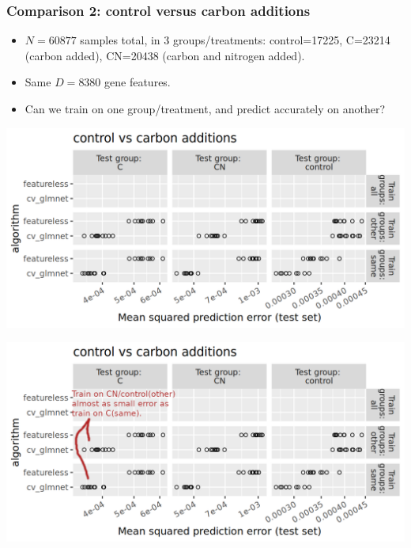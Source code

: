\documentclass{beamer}
\begin{document}

\begin{frame}
  \frametitle{Comparison 2: control versus carbon additions}
  \begin{itemize}
  \item $N=60877$ samples total, in 3 groups/treatments:
    control=17225, C=23214 (carbon added), CN=20438 (carbon and nitrogen added).
  \item Same $D=8380$ gene features.
  \item Can we train on one group/treatment, and predict accurately on another?
  \end{itemize}
\end{frame}

\begin{frame}
  \includegraphics[width=\textwidth]{qsip_pc2_all_new-control.vs.carbon.additions.other.png}
\end{frame}

\begin{frame}
  \includegraphics[width=\textwidth]{qsip_pc2_all_new-control.vs.carbon.additions.other.1.png}
\end{frame}
\end{document}
